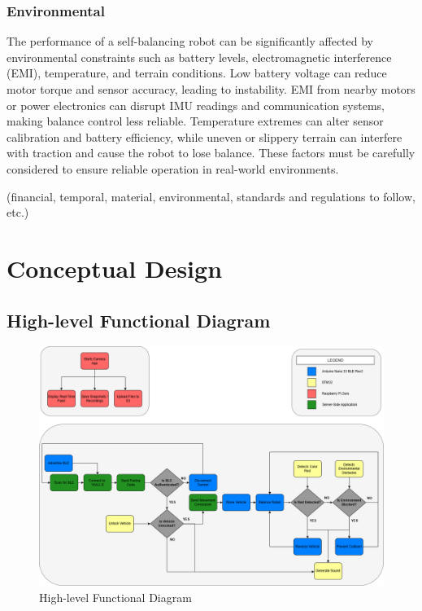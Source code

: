 \documentclass{article}
\begin{document}
\subsubsection{Environmental}
The performance of a self-balancing robot can be significantly affected by environmental constraints such as battery levels, electromagnetic interference (EMI), temperature, and terrain conditions. Low battery voltage can reduce motor torque and sensor accuracy, leading to instability. EMI from nearby motors or power electronics can disrupt IMU readings and communication systems, making balance control less reliable. Temperature extremes can alter sensor calibration and battery efficiency, while uneven or slippery terrain can interfere with traction and cause the robot to lose balance. These factors must be carefully considered to ensure reliable operation in real-world environments.

(financial, temporal, material, environmental, standards and regulations to follow, etc.)

\section{Conceptual Design}

\subsection{High-level Functional Diagram}

\begin{figure}[H]
    \centering
    \includegraphics[width=1\textwidth]{Figures/Functional_Diagram.png}
    \caption{High-level Functional Diagram}
    \label{fig:functional_diagram}
\end{figure}
\end{document}
